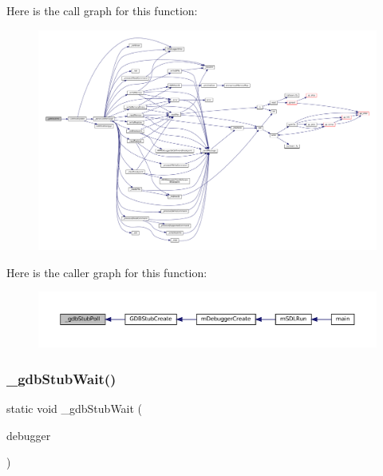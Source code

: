 Here is the call graph for this function\+:
\nopagebreak
\begin{figure}[H]
\begin{center}
\leavevmode
\includegraphics[width=350pt]{gdb-stub_8c_ae58295c549402f4ef20ff8aad2c5dfeb_cgraph}
\end{center}
\end{figure}
Here is the caller graph for this function\+:
\nopagebreak
\begin{figure}[H]
\begin{center}
\leavevmode
\includegraphics[width=350pt]{gdb-stub_8c_ae58295c549402f4ef20ff8aad2c5dfeb_icgraph}
\end{center}
\end{figure}
\mbox{\label{gdb-stub_8c_a611cb8cc4b4a1b0885f3d3a45487045b}} 
\subsubsection{\texorpdfstring{\+\_\+gdb\+Stub\+Wait()}{\_gdbStubWait()}}
{\footnotesize\ttfamily static void \+\_\+gdb\+Stub\+Wait (\begin{DoxyParamCaption}\item[{struct m\+Debugger $\ast$}]{debugger }\end{DoxyParamCaption})\hspace{0.3cm}{\ttfamily [static]}}

